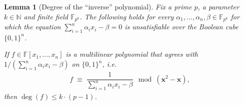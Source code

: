 \documentclass[11pt]{article}
\newtheorem{lemma}[theorem]{Lemma}
\newcommand{\Boo}{\{0,1 \}}
\newcommand{\F}{\mathbb{F}}
\begin{document}
\begin{lemma}[Degree of the ``inverse'' polynomial]\label{lemma:deg-inverse-poly}
Fix a prime $p$, a parameter $k \in \mathbb{N}$ and finite field $\F_{p^{k}}$. The following holds for every $\alpha_{1},\ldots,\alpha_{n},\beta \in \F_{p^{k}}$ for which the equation $\sum_{i=1}^{n} \alpha_{i} x_{i} - \beta = 0$ is unsatisfiable over the Boolean cube $\Boo^{n}$.\newline

If $f \in \F[x_{1},\ldots,x_{n}]$ is a multilinear polynomial that agrees with $1/(\sum_{i=1}^{n} \alpha_{i}x_{i} - \beta)$ on $\Boo^{n}$, i.e.
\begin{align*}
    f \; \equiv \; \dfrac{1}{\sum_{i=1}^{n} \alpha_{i} x_{i} - \beta} \mod{(\mathbf{x}^{2} - \mathbf{x})},
\end{align*}
then $\deg(f) \leq k \cdot (p-1)$.
\end{lemma}
\end{document}
